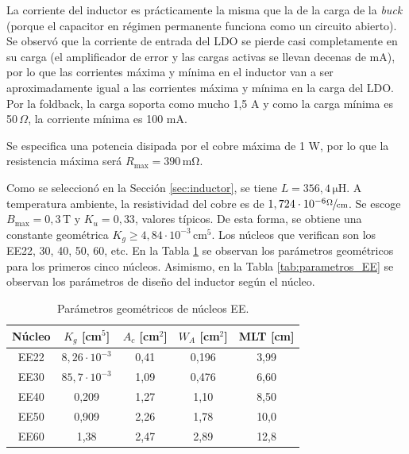 \documentclass[a4paper,12pt]{article}
\begin{document}
La corriente del inductor es prácticamente la misma que la de la carga de la \textit{buck} (porque el capacitor en régimen permanente funciona como un circuito abierto). Se observó que la corriente de entrada del LDO se pierde casi completamente en su carga (el amplificador de error y las cargas activas se llevan decenas de mA), por lo que las corrientes máxima y mínima en el inductor van a ser aproximadamente igual a las corrientes máxima y mínima en la carga del LDO. Por la foldback, la carga soporta como mucho 1,5 A y como la carga mínima es 50$\,\Omega$, la corriente mínima es 100 mA.

Se especifica una potencia disipada por el cobre máxima de 1 W, por lo que la resistencia máxima será $R_\text{max} = 390\,\mathrm{m\Omega}$.

Como se seleccionó en la Sección \ref{sec:inductor}, se tiene $L = 356,4\,\mathrm{\mu H}$. A temperatura ambiente, la resistividad del cobre es de $1,724 \cdot 10^{-6}\sfrac{\Omega}{\text{cm}}$. Se escoge $B_\text{max} = 0,3\,$T y $K_u = 0,33$, valores típicos. De esta forma, se obtiene una constante geométrica $K_g \ge 4,84 \cdot 10^{-3} \,\mathrm{cm^5}$. Los núcleos que verifican son los EE22, 30, 40, 50, 60, etc. En la Tabla \ref{tab:nucleos_EE} se observan los parámetros geométricos para los primeros cinco núcleos. Asimismo, en la Tabla \ref{tab:parametros_EE} se observan los parámetros de diseño del inductor según el núcleo.

\begin{table}[h]
\centering
\begin{tabular}{|c|c|c|c|c|}
\hline
\textbf{Núcleo} &
\textbf{$K_g$ [cm$^5$]} &
\textbf{$A_c$ [cm$^2$]} &
\textbf{$W_A$ [cm$^2$]} &
\textbf{MLT [cm]} \\
\hline
EE22 & $8,26\cdot10^{-3}$ & 0,41 & 0,196 & 3,99 \\
EE30 & $85,7\cdot10^{-3}$ & 1,09 & 0,476 & 6,60 \\
EE40 & 0,209 & 1,27 & 1,10 & 8,50 \\
EE50 & 0,909 & 2,26 & 1,78 & 10,0 \\
EE60 & 1,38 & 2,47 & 2,89 & 12,8 \\
\hline
\end{tabular}
\caption{Parámetros geométricos de núcleos EE.}
\label{tab:nucleos_EE}
\end{table}
\end{document}
